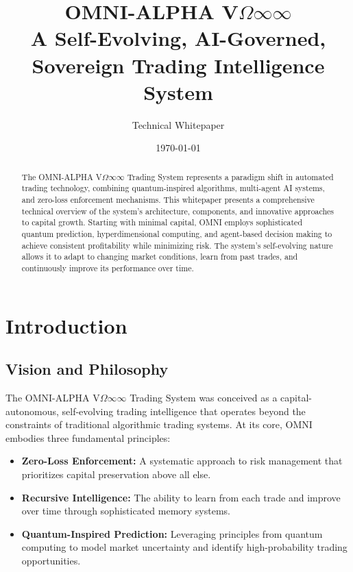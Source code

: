\documentclass[11pt,a4paper]{article}
\begin{document}
\title{OMNI-ALPHA V$\Omega\infty\infty$\\
\large A Self-Evolving, AI-Governed, Sovereign Trading Intelligence System}
\author{Technical Whitepaper}
\date{\today}
\maketitle

\begin{abstract}
The OMNI-ALPHA V$\Omega\infty\infty$ Trading System represents a paradigm shift in automated trading technology, combining quantum-inspired algorithms, multi-agent AI systems, and zero-loss enforcement mechanisms. This whitepaper presents a comprehensive technical overview of the system's architecture, components, and innovative approaches to capital growth. Starting with minimal capital, OMNI employs sophisticated quantum prediction, hyperdimensional computing, and agent-based decision making to achieve consistent profitability while minimizing risk. The system's self-evolving nature allows it to adapt to changing market conditions, learn from past trades, and continuously improve its performance over time.
\end{abstract}

\tableofcontents
\newpage

\section{Introduction}

\subsection{Vision and Philosophy}

The OMNI-ALPHA V$\Omega\infty\infty$ Trading System was conceived as a capital-autonomous, self-evolving trading intelligence that operates beyond the constraints of traditional algorithmic trading systems. At its core, OMNI embodies three fundamental principles:

\begin{itemize}
    \item \textbf{Zero-Loss Enforcement:} A systematic approach to risk management that prioritizes capital preservation above all else.
    \item \textbf{Recursive Intelligence:} The ability to learn from each trade and improve over time through sophisticated memory systems.
    \item \textbf{Quantum-Inspired Prediction:} Leveraging principles from quantum computing to model market uncertainty and identify high-probability trading opportunities.
\end{itemize}
\end{document}
